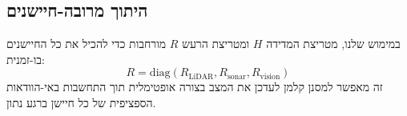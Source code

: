 \subsection{היתוך  מרובה-חיישנים}
במימוש שלנו, מטריצת המדידה $H$ ומטריצת הרעש $R$ מורחבות כדי להכיל את כל החיישנים בו-זמנית:
\begin{equation}
    R = \text{diag}(R_{\text{LiDAR}}, R_{\text{sonar}}, R_{\text{vision}})
    \label{eq:multi_sensor_r}
\end{equation}
זה מאפשר למסנן קלמן לעדכן את המצב בצורה אופטימלית תוך התחשבות באי-הוודאות הספציפית של כל חיישן ברגע נתון.
